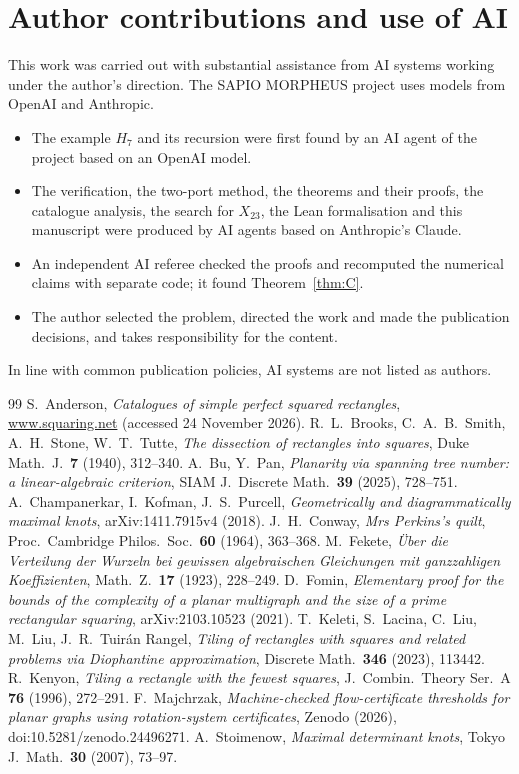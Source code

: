 \documentclass[11pt]{amsart}
\theoremstyle{plain}
\theoremstyle{definition}
\theoremstyle{remark}
\begin{document}
\section*{Author contributions and use of AI}
This work was carried out with substantial assistance from AI systems working under the author's direction. The
SAPIO MORPHEUS project uses models from OpenAI and Anthropic.
\begin{itemize}
\item The example $H_7$ and its recursion were first found by an AI agent of the project based on an OpenAI model.
\item The verification, the two-port method, the theorems and their proofs, the catalogue analysis, the search for
  $X_{23}$, the Lean formalisation and this manuscript were produced by AI agents based on Anthropic's Claude.
\item An independent AI referee checked the proofs and recomputed the numerical claims with separate code; it
  found Theorem~\ref{thm:C}.
\item The author selected the problem, directed the work and made the publication decisions, and takes
  responsibility for the content.
\end{itemize}
In line with common publication policies, AI systems are not listed as authors.

\begin{thebibliography}{99}
 S.~Anderson, \emph{Catalogues of simple perfect squared rectangles}, \url{www.squaring.net}
  (accessed 24 November 2026).
 R.~L.~Brooks, C.~A.~B.~Smith, A.~H.~Stone, W.~T.~Tutte, \emph{The dissection of rectangles into
  squares}, Duke Math.\ J.\ \textbf{7} (1940), 312--340.
 A.~Bu, Y.~Pan, \emph{Planarity via spanning tree number: a linear-algebraic criterion}, SIAM J.\
  Discrete Math.\ \textbf{39} (2025), 728--751.
 A.~Champanerkar, I.~Kofman, J.~S.~Purcell, \emph{Geometrically and diagrammatically maximal
  knots}, arXiv:1411.7915v4 (2018).
 J.~H.~Conway, \emph{Mrs Perkins's quilt}, Proc.\ Cambridge Philos.\ Soc.\ \textbf{60} (1964),
  363--368.
 M.~Fekete, \emph{\"Uber die Verteilung der Wurzeln bei gewissen algebraischen Gleichungen mit
  ganzzahligen Koeffizienten}, Math.\ Z.\ \textbf{17} (1923), 228--249.
\bibitem{Fomin} D.~Fomin, \emph{Elementary proof for the bounds of the complexity of a planar multigraph and the
  size of a prime rectangular squaring}, arXiv:2103.10523 (2021).
\bibitem{Keleti} T.~Keleti, S.~Lacina, C.~Liu, M.~Liu, J.~R.~Tuir\'an Rangel, \emph{Tiling of rectangles with
  squares and related problems via Diophantine approximation}, Discrete Math.\ \textbf{346} (2023), 113442.
\bibitem{Kenyon} R.~Kenyon, \emph{Tiling a rectangle with the fewest squares}, J.\ Combin.\ Theory Ser.\ A
  \textbf{76} (1996), 272--291.
 F.~Majchrzak, \emph{Machine-checked flow-certificate thresholds for planar graphs using
  rotation-system certificates}, Zenodo (2026), doi:10.5281/zenodo.24496271.
\bibitem{Stoimenow} A.~Stoimenow, \emph{Maximal determinant knots}, Tokyo J.\ Math.\ \textbf{30} (2007),
  73--97.
\end{thebibliography}
\end{document}
